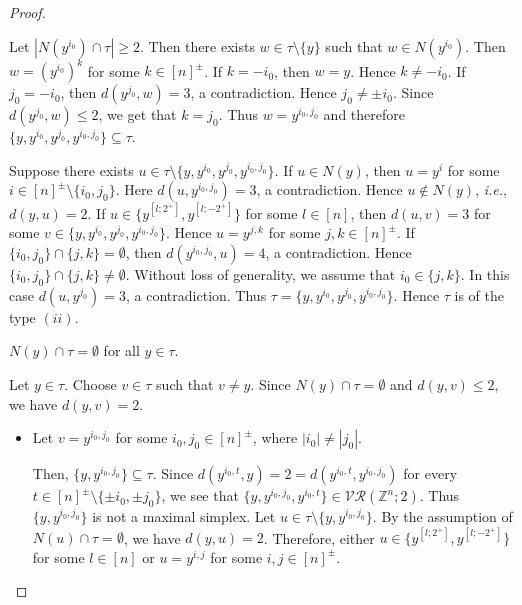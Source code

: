 \documentclass{amsart}
\theoremstyle{definition}
\theoremstyle{remark}
\numberwithin{equation}{section}
\newcommand{\vr}[2]{\mathcal{VR}(#1;#2)}
\begin{document}
\begin{proof}
\begin{itemize}
Let $|N(y^{i_0}) \cap \tau | \geq 2$. Then there exists  $ w\in \tau \setminus \{y\}$ such that $w \in N( y^{i_0})$.  Then
		$w = (y^{i_0})^{ k}$ for some $k \in [n]^{\pm}$. If $k = -i_0$, then $w= y$. Hence $k \neq -i_0$. If $j_0 = -i_0$, then $d(y^{j_0}, w) = 3$, a contradiction. Hence $j_0 \neq \pm i_0$. Since  $d(y^{j_0}, w) \leq  2$, we get that  $k = j_0$.  Thus $w = y^{i_0, j_0}$ and therefore $\{y, y^{i_0}, y^{j_0}, y^{i_0, j_0}\} \subseteq \tau$. 


        
      Suppose  there exists $u \in \tau \setminus \{y, y^{i_0}, y^{j_0}, y^{i_0, j_0}\}$. If $u \in N(y)$, then $u = y^{i}$ for some $i \in [n]^{\pm} \setminus \{i_0, j_0\}$. Here $d(u, y^{i_0, j_0}) = 3$, a contradiction. Hence $u \notin N( y)$, {\it i.e.}, $d(y, u) = 2$. If   $u \in \{y^{[l; 2^+]}, y^{[l; -2^+]}\}$ for some $l \in [n]$, then  $d(u, v) = 3$ for some $v \in \{y, y^{i_0}, y^{j_0}, y^{i_0, j_0}\}$. Hence $u = y^{j, k}$ for some $j, k \in [n]^{\pm}$. If $\{i_0, j_0\} \cap \{j, k\} = \emptyset$, then $d(y^{i_0,j_0}, u) = 4$, a contradiction. Hence $\{i_0, j_0\} \cap \{j, k\} \neq \emptyset$. Without loss of generality, we assume that $i_0 \in \{j, k\}$. In this case $d(u, y^{j_0}) = 3$, a contradiction. Thus $\tau = \{y, y^{i_0}, y^{j_0}, y^{i_0, j_0}\} $. Hence $\tau$ is of the type $(ii)$.
	\end{itemize}
    
	 $N(y) \cap \tau = \emptyset$ for all $y \in \tau$.
    
    Let $y \in \tau$. Choose  $v \in \tau$ such that $v \neq y$. Since $N(y) \cap \tau = \emptyset$ and $d(y, v) \leq 2$, we have $d(y,v ) = 2$.

	\begin{itemize}
		\item[(1)] Let $v= y^{i_0, j_0}$ for some $i_0, j_0 \in [n]^{\pm}$, where   $|i_0| \neq |j_0|$. 

Then, $\{y, y^{i_0, j_0}\} \subseteq \tau$. Since  $d(y^{i_0,t }, y) = 2 = d(y^{i_0, t}, y^{i_0, j_0})$ for every $t \in [n]^{\pm} \setminus \{\pm i_0, \pm j_0\}$, we see that $\{y, y^{i_0, j_0}, y^{i_0, t}\} \in\vr{\mathbb{Z}^n}{2} $. Thus $\{y, y^{i_0, j_0}\}$ is  not a maximal simplex. Let $u \in \tau \setminus \{y, y^{i_0, j_0}\}$. By the assumption of $N(u) \cap \tau = \emptyset$, we have $d(y, u) = 2$. Therefore, either $u \in \{y^{[l; 2^+]}, y^{[l; -2^+]}\}$ for some $l \in [n]$ or $u = y^{i, j}$ for some $ i, j \in [n]^{\pm}$. 
		

\end{itemize}
\end{proof}
\end{document}
